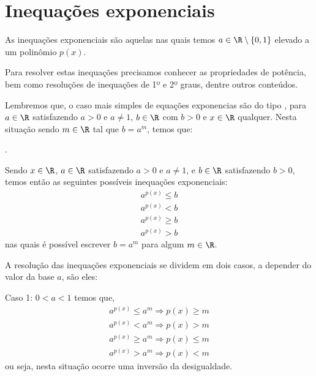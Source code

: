  \section{Inequações exponenciais}
 
 \vskip0.3cm
 \colorbox{azul}{
 \begin{minipage}{0.9\linewidth}
 \begin{center}
 As inequações exponenciais são aquelas nas quais temos $a \in \R \setminus \{0, 1\}$ elevado a um polinômio $p(x)$.
 \end{center}
 \end{minipage}}
 \vskip0.3cm 
 
 Para resolver estas inequações precisamos conhecer as propriedades de potência, bem como resoluções de inequações de 1º e 2º graus, dentre outros conteúdos. 
 
  Lembremos que, o caso mais simples de equações exponencias são do tipo
 ,
 para $a \in \R$ satisfazendo $a > 0$ e $a \neq 1$, $b \in \R$ com $b > 0$ e $x \in \R$ qualquer. Nesta situação sendo $m \in \R$ tal que $b= a^{m}$, temos que:

 .
 
 \vskip0.3cm
 \colorbox{azul}{
 \begin{minipage}{0.9\linewidth}
 \begin{center}
  Sendo $x \in \R$, $a \in \R$ satisfazendo $a > 0$ e $a \neq 1$, e $b \in \R$ satisfazendo $b > 0$, temos então as seguintes possíveis inequações exponenciais:
 \begin{eqnarray*}
 a^{p(x)} \leq b \\
 a^{p(x)} < b \\
 a^{p(x)} \geq b \\
 a^{p(x)} > b 
 \end{eqnarray*} 
 nas quais é possível escrever $b=a^m$ para algum $m \in \R$.
 \end{center}
 \end{minipage}}
 \vskip0.3cm 
 
 A resolução das inequações exponenciais se dividem em dois casos, a depender do valor da base $a$, são eles:
 
 Caso 1: $0 < a < 1$ temos que,
  \begin{eqnarray*}
 a^{p(x)} \leq a^m \Rightarrow p(x) \geq m\\
 a^{p(x)} < a^m \Rightarrow p(x) > m \\
 a^{p(x)} \geq a^m \Rightarrow p(x) \leq m\\
 a^{p(x)} > a^m \Rightarrow p(x) < m
 \end{eqnarray*}
 ou seja, nesta situação ocorre uma inversão da desigualdade.
 
